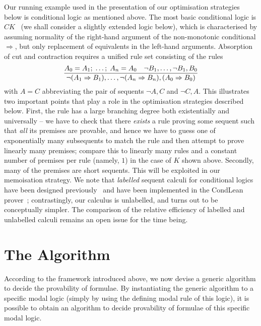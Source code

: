 \documentclass{entcs} \usepackage{entcsmacro}
\begin{document}
Our running example used in the presentation of our optimisation
strategies below is conditional logic as mentioned above. The most
basic conditional logic is $\mathit{CK}$~\cite{Chellas80} (we shall
consider a slightly extended logic below), which is characterised by
assuming normality of the right-hand argument of the non-monotonic
conditional $\Rightarrow$, but only replacement of equivalents in the
left-hand arguments. Absorption of cut and contraction requires a
unified rule set consisting of the rules
\begin{equation*}
  \frac{A_0=A_1;\;\dots;\; A_n=A_0\quad \neg B_1,\dots,\neg B_1,B_0}{\neg(A_1\Rightarrow B_1),\dots,\neg(A_n\Rightarrow B_n),(A_0\Rightarrow B_0)}
\end{equation*}
with $A=C$ abbreviating the pair of sequents $\neg A,C$ and $\neg
C,A$.  This illustrates two important points that play a role in the
optimisation strategies described below. First, the rule has a large
branching degree both existentially and universally -- we have to
check that there \emph{exists} a rule proving some sequent such that
\emph{all} its premises are provable, and hence we have to guess one
of exponentially many subsequents to match the rule and then attempt
to prove linearly many premises; compare this to linearly many rules
and a constant number of premises per rule (namely, $1$) in the case
of $K$ shown above. Secondly, many of the premises are short
sequents. This will be exploited in our memoisation strategy. We note
that \emph{labelled} sequent calculi for conditional logics have been
designed previously~\cite{OlivettiEA07} and have been implemented in
the CondLean prover~\cite{OlivettiPozzato03}; contrastingly, our
calculus is unlabelled, and turns out to be conceptually simpler. The
comparison of the relative efficiency of labelled and unlabelled
calculi remains an open issue for the time being.

\section{The Algorithm}

According to the framework introduced above, we now devise a generic
algorithm to decide the provability of formulae. By instantiating the
generic algorithm to a specific modal logic (simply by using the
defining modal rule of this logic), it is possible to obtain an
algorithm to decide provability of formulae of this specific modal
logic.
\noindent 
\end{document}
